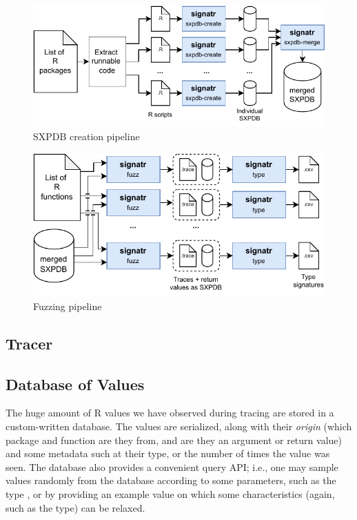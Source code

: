 \documentclass[sigplan,anonymous,review]{acmart}
\begin{document}
\begin{figure}
    \centering
    \includegraphics[width=\columnwidth]{code-and-figures/sxdb-pipeline.pdf}
    \caption{SXPDB creation pipeline}\label{fig:sxpdb-pipeline}
\end{figure}

\begin{figure}
    \centering
    \includegraphics[width=\columnwidth]{code-and-figures/fuzz-pipeline.pdf}
    \caption{Fuzzing pipeline}\label{fig:fuzz-pipeline}
\end{figure}

\subsection{Tracer}


\subsection{Database of Values}

The huge amount of R values we have observed during tracing are stored in a custom-written database. 
The values are serialized, along with their \textit{origin} (which package and function are they from, and are they an argument or return value) and some metadata such at their type, or the number of times the value was seen. 
The database also provides a convenient query API; i.e., one may sample values randomly from the database according to some parameters, such as the type , or by providing an example value on which some characteristics (again, such as the type) can be relaxed.
\end{document}
